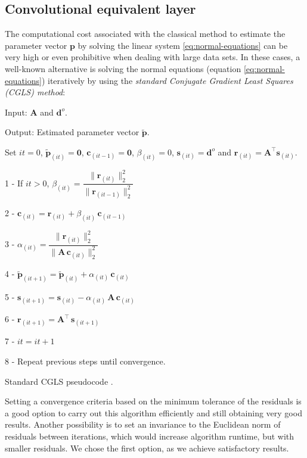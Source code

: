 \documentclass[manuscript]{geophysics}
\begin{document}
	\subsection{Convolutional equivalent layer}
	
	The computational cost associated with the classical method to estimate the parameter 
	vector $\mathbf{p}$ by solving the linear system \ref{eq:normal-equations} can be very high 
	or even prohibitive when dealing with large data sets. In these cases, a well-known alternative
	is solving the normal equations (equation \ref{eq:normal-equations}) iteratively by 
	using the \textit{standard Conjugate Gradient Least Squares (CGLS) method}:
	
	\begin{algorithm}[H]
		Input: $\mathbf{A}$ and $\mathbf{d}^{o}$.
		
		Output: Estimated parameter vector $\tilde{\mathbf{p}}$.
		
		Set $it = 0$, $\tilde{\mathbf{p}}_{(it)} = \mathbf{0}$, $\mathbf{c}_{(it-1)} = \mathbf{0}$, $\beta_{(it)} = 0$, $\mathbf{s}_{(it)} = \mathbf{d}^{o}$ and $\mathbf{r}_{(it)} = \mathbf{A}^{\top} \mathbf{s}_{(it)}$.
		
		1 - If $it > 0$, $\beta_{(it)} = \dfrac{\| \mathbf{r}_{(it)} \|_{2}^{2}}{\| \mathbf{r}_{(it - 1)} \|_{2}^{2}}$
		
		2 - $\mathbf{c}_{(it)} = \mathbf{r}_{(it)} + \beta_{(it)} \, \mathbf{c}_{(it - 1)}$
		
		3 - $\alpha_{(it)} = \dfrac{{\| \mathbf{r}_{(it)}\|_{2}^{2}}}{\| \mathbf{A} \, \mathbf{c}_{(it)} \|_{2}^{2}}$
		
		4 - $\tilde{\mathbf{p}}_{(it + 1)} = \tilde{\mathbf{p}}_{(it)} + \alpha_{(it)} \, \mathbf{c}_{(it)}$
		
		5 - $\mathbf{s}_{(it + 1)} = \mathbf{s}_{(it)} - \alpha_{(it)} \, \mathbf{A} \, \mathbf{c}_{(it)}$
		
		6 - $\mathbf{r}_{(it + 1)} = \mathbf{A}^{\top} \, \mathbf{s}_{(it + 1)}$
		
		7 - $it = it + 1$
		
		8 - Repeat previous steps until convergence.
		
		\caption{Standard CGLS pseudocode \citep[][ p. 166]{aster2019parameter}.}
		\label{al:std-cgls-algorithm}
	\end{algorithm}
	
	Setting a convergence criteria based on the minimum tolerance of the residuals is a good 
	option to carry out this algorithm efficiently and still obtaining very good results. 
	Another possibility is to set an invariance to the Euclidean norm of residuals between 
	iterations, which would increase algorithm runtime, but with smaller residuals. 
	We chose the first option, as we achieve satisfactory results. 
	
\end{document}
